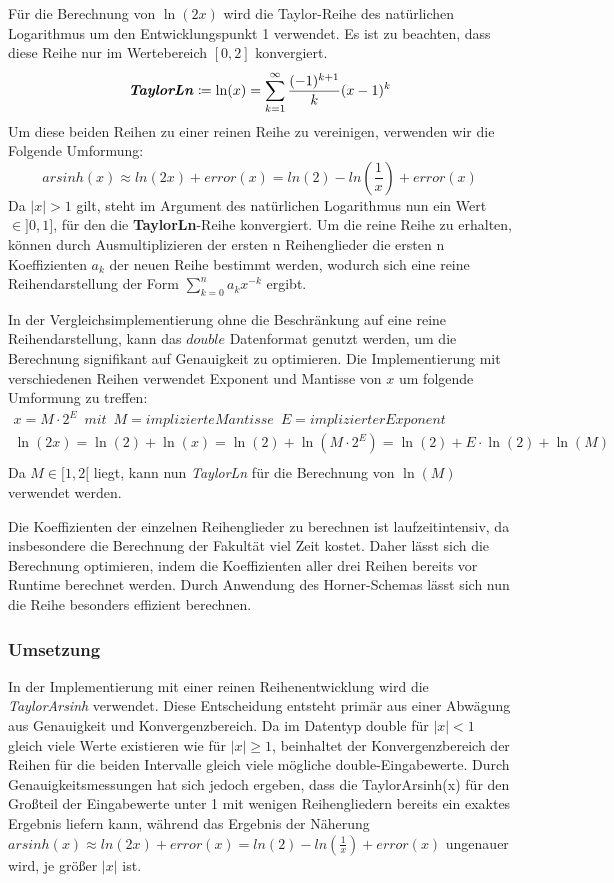 \documentclass[course=erap] {aspdoc}
\begin{document}
    Für die Berechnung von $\ln(2x)$ wird die Taylor-Reihe des natürlichen Logarithmus um den Entwicklungspunkt 1 verwendet.
    Es ist zu beachten, dass diese Reihe nur im Wertebereich $[0, 2]$ konvergiert.
    \[
        \textbf{\textit{TaylorLn}}\coloneqq\ln(x) = \sum_{k = 1}^{\infty} \frac{(-1)^{k + 1}}{k}(x - 1)^k
    \]
    Um diese beiden Reihen zu einer reinen Reihe zu vereinigen, verwenden wir die Folgende Umformung:
    \[
        arsinh(x)\approx ln(2x) + error(x) = ln(2) - ln(\frac{1}{x}) + error(x)
    \]
    Da $|x|>1$ gilt, steht im Argument des natürlichen Logarithmus nun ein Wert $\in ]0, 1]$, für den die \textbf{TaylorLn}-Reihe konvergiert.
    Um die reine Reihe zu erhalten, können durch Ausmultiplizieren der ersten n Reihenglieder die ersten n Koeffizienten $a_k$ der neuen Reihe bestimmt werden, wodurch sich eine reine Reihendarstellung der Form $\sum_{k=0}^{n} a_k x^{-k}$ ergibt.

    
    
    In der Vergleichsimplementierung ohne die Beschränkung auf eine reine Reihendarstellung, kann das $double$ Datenformat genutzt werden, um die Berechnung signifikant auf Genauigkeit zu optimieren. Die Implementierung mit verschiedenen Reihen verwendet Exponent und Mantisse von $x$ um folgende Umformung zu treffen:
    \begin{gather*}
        x = M\cdot2^E \,\,\, mit \,\,\, M = implizierte Mantisse \,\,\, E = implizierter Exponent\\
        \ln(2x) = \ln(2) + \ln(x) = \ln(2) + \ln(M\cdot2^E) = \ln(2) + E\cdot\ln(2) + \ln(M)\\
    \end{gather*}
    Da $M\in[1, 2[$ liegt, kann nun \textit{TaylorLn} für die Berechnung von $\ln(M)$ verwendet werden.

    
    Die Koeffizienten der einzelnen Reihenglieder zu berechnen ist laufzeitintensiv, da insbesondere die Berechnung der Fakultät viel Zeit kostet.
    Daher lässt sich die Berechnung optimieren, indem die Koeffizienten aller drei Reihen bereits vor Runtime berechnet werden.
    Durch Anwendung des Horner-Schemas lässt sich nun die Reihe besonders effizient berechnen.

    \subsubsection{Umsetzung}
    In der Implementierung mit einer reinen Reihenentwicklung wird die \textit{TaylorArsinh} verwendet. Diese Entscheidung entsteht primär aus einer Abwägung aus Genauigkeit und Konvergenzbereich. Da im Datentyp double für $|x|<1$ gleich viele Werte existieren wie für $|x|\geq1$, beinhaltet der Konvergenzbereich der Reihen für die beiden Intervalle gleich viele mögliche double-Eingabewerte. Durch Genauigkeitsmessungen hat sich jedoch ergeben, dass die TaylorArsinh(x) für den Großteil der Eingabewerte unter 1 mit wenigen Reihengliedern bereits ein exaktes Ergebnis liefern kann, während das Ergebnis der Näherung $ arsinh(x)\approx ln(2x) + error(x) = ln(2) - ln(\frac{1}{x}) + error(x)$ ungenauer wird, je größer $|x|$ ist. 
\end{document}
